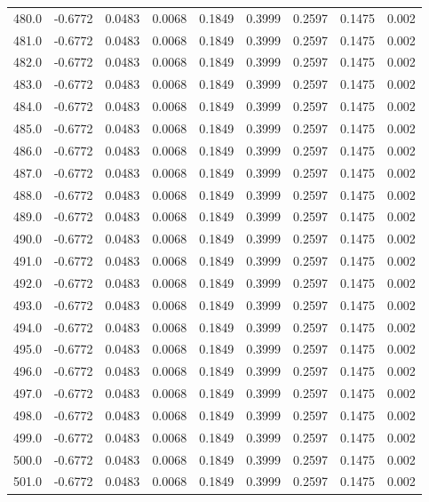 \begin{longtable}{lrrrrrrrr}
480.0 & -0.6772 & 0.0483 & 0.0068 & 0.1849 & 0.3999 & 0.2597 & 0.1475 & 0.002 \\
481.0 & -0.6772 & 0.0483 & 0.0068 & 0.1849 & 0.3999 & 0.2597 & 0.1475 & 0.002 \\
482.0 & -0.6772 & 0.0483 & 0.0068 & 0.1849 & 0.3999 & 0.2597 & 0.1475 & 0.002 \\
483.0 & -0.6772 & 0.0483 & 0.0068 & 0.1849 & 0.3999 & 0.2597 & 0.1475 & 0.002 \\
484.0 & -0.6772 & 0.0483 & 0.0068 & 0.1849 & 0.3999 & 0.2597 & 0.1475 & 0.002 \\
485.0 & -0.6772 & 0.0483 & 0.0068 & 0.1849 & 0.3999 & 0.2597 & 0.1475 & 0.002 \\
486.0 & -0.6772 & 0.0483 & 0.0068 & 0.1849 & 0.3999 & 0.2597 & 0.1475 & 0.002 \\
487.0 & -0.6772 & 0.0483 & 0.0068 & 0.1849 & 0.3999 & 0.2597 & 0.1475 & 0.002 \\
488.0 & -0.6772 & 0.0483 & 0.0068 & 0.1849 & 0.3999 & 0.2597 & 0.1475 & 0.002 \\
489.0 & -0.6772 & 0.0483 & 0.0068 & 0.1849 & 0.3999 & 0.2597 & 0.1475 & 0.002 \\
490.0 & -0.6772 & 0.0483 & 0.0068 & 0.1849 & 0.3999 & 0.2597 & 0.1475 & 0.002 \\
491.0 & -0.6772 & 0.0483 & 0.0068 & 0.1849 & 0.3999 & 0.2597 & 0.1475 & 0.002 \\
492.0 & -0.6772 & 0.0483 & 0.0068 & 0.1849 & 0.3999 & 0.2597 & 0.1475 & 0.002 \\
493.0 & -0.6772 & 0.0483 & 0.0068 & 0.1849 & 0.3999 & 0.2597 & 0.1475 & 0.002 \\
494.0 & -0.6772 & 0.0483 & 0.0068 & 0.1849 & 0.3999 & 0.2597 & 0.1475 & 0.002 \\
495.0 & -0.6772 & 0.0483 & 0.0068 & 0.1849 & 0.3999 & 0.2597 & 0.1475 & 0.002 \\
496.0 & -0.6772 & 0.0483 & 0.0068 & 0.1849 & 0.3999 & 0.2597 & 0.1475 & 0.002 \\
497.0 & -0.6772 & 0.0483 & 0.0068 & 0.1849 & 0.3999 & 0.2597 & 0.1475 & 0.002 \\
498.0 & -0.6772 & 0.0483 & 0.0068 & 0.1849 & 0.3999 & 0.2597 & 0.1475 & 0.002 \\
499.0 & -0.6772 & 0.0483 & 0.0068 & 0.1849 & 0.3999 & 0.2597 & 0.1475 & 0.002 \\
500.0 & -0.6772 & 0.0483 & 0.0068 & 0.1849 & 0.3999 & 0.2597 & 0.1475 & 0.002 \\
501.0 & -0.6772 & 0.0483 & 0.0068 & 0.1849 & 0.3999 & 0.2597 & 0.1475 & 0.002 \\

\end{longtable}
